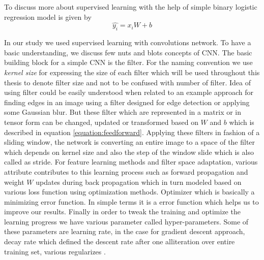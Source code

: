 To discuss more about supervised learning with the help of simple binary logistic regression model is given by
\begin{equation} \label{equation:feedforward}
    \hat{y_{i}} = x_{i}W + b 
\end{equation}

In our study we used supervised learning with convolutions network. To have a basic understanding, we discuss few nuts and blots concepts of CNN. The basic building block for a simple CNN is the filter. For the naming convention we use \textit{kernel size} for expressing the size of each filter which will be used throughout this thesis to denote filter size and not to be confused with number of filter. Idea of using filter could be easily understood when related to an example approach for finding edges in an image using a filter designed for edge detection or applying some Gaussian blur. But these filter which are represented in a matrix or in tensor form can be changed, updated or transformed based on \(W\) and \(b\) which is described in equation \ref{equation:feedforward}. Applying these filters in fashion of a sliding window, the network is converting an entire image to a space of the filter which depends on kernel size and also the step of the window slide which is also called as stride. For feature learning methods and filter space adaptation, various attribute contributes to this learning process such as forward propagation and weight \(W\) updates during back propagation which in turn modeled based on various loss function using optimization methods. Optimizer which is basically a minimizing error function. In simple terms it is a error function which helps us to improve our results. Finally in order to tweak the training and optimize the learning progress we have various parameter called hyper-parameters. Some of these parameters are learning rate, in the case for gradient descent approach, decay rate which defined the descent rate after one alliteration over entire training set, various regularizes \cite{friedman2001elements}. 




